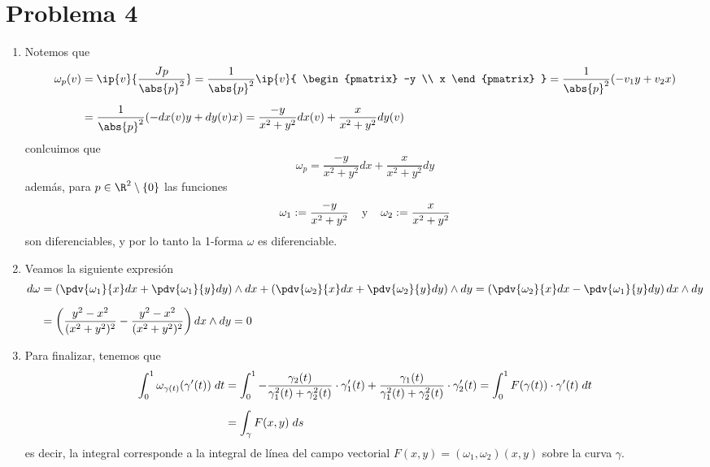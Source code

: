\documentclass{article}
\begin{document}
\section*{Problema 4}
\begin{enumerate}
    \item Notemos que
    \begin{align*}
        \omega_{p}(v) &= \ip{v}{\frac{Jp}{\abs{p}^{2}}}=\frac{1}{\abs{p}^{2}}\ip{v}{
            \begin{pmatrix}
                -y \\
                x
            \end{pmatrix}
            }=\frac{1}{\abs{p}^{2}}(-v_{1}y+v_{2}x) \\[2mm]
        &= \frac{1}{\abs{p}^{2}}(-dx(v)y+dy(v)x)=\frac{-y}{x^{2}+y^{2}}dx(v)
        +\frac{x}{x^{2}+y^{2}}dy(v)
    \end{align*}
    conlcuimos que
    \begin{equation*}
        \omega_{p}=\frac{-y}{x^{2}+y^{2}}dx+\frac{x}{x^{2}+y^{2}}dy
    \end{equation*}
    además, para $p\in\R^{2}\setminus\{0\}$ las funciones
    \begin{equation*}
        \omega_{1}:=\frac{-y}{x^{2}+y^{2}}\hspace{4mm}\text{y}
        \hspace{4mm}\omega_{2}:=\frac{x}{x^{2}+y^{2}}
    \end{equation*}
    son diferenciables, y por lo tanto la 1-forma $\omega$ es diferenciable.
    
    \item Veamos la siguiente expresión
    \begin{align*}
        d\omega &= \left(\pdv{\omega_{1}}{x}dx+\pdv{\omega_{1}}{y}dy\right)\land dx
        +\left(\pdv{\omega_{2}}{x}dx+\pdv{\omega_{2}}{y}dy\right)\land dy
        =\left(\pdv{\omega_{2}}{x}dx-\pdv{\omega_{1}}{y}dy\right)dx\land dy \\[2mm]
        &= \left(\frac{y^{2}-x^{2}}{(x^{2}+y^{2})^{2}}
        -\frac{y^{2}-x^{2}}{(x^{2}+y^{2})^{2}}\right)dx\land dy=0
    \end{align*}
    
    \item Para finalizar, tenemos que
    \begin{align*}
        \int_{0}^{1}\omega_{\gamma(t)}(\gamma'(t))\hspace{1mm}dt &= \int_{0}^{1}
        -\frac{\gamma_{2}(t)}{\gamma_{1}^{2}(t)+\gamma_{2}^{2}(t)}\cdot\gamma_{1}'(t)
        +\frac{\gamma_{1}(t)}{\gamma_{1}^{2}(t)+\gamma_{2}^{2}(t)}\cdot\gamma_{2}'(t)
        =\int_{0}^{1}F(\gamma(t))\cdot\gamma'(t)\hspace{1mm}dt \\[2mm]
        &= \int_{\gamma}F(x,y)\hspace{1mm}ds
    \end{align*}
    es decir, la integral corresponde a la integral de línea del campo vectorial 
    $F(x,y)=(\omega_{1},\omega_{2})(x,y)$ sobre la curva $\gamma$.
\end{enumerate}
\end{document}
